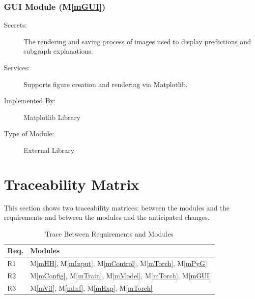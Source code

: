 \documentclass[12pt, titlepage]{article}
\newcommand{\mref}[1]{M\ref{#1}}
\begin{document}
\subsubsection{GUI Module (\mref{mGUI})}
\begin{description} 
\item[Secrets:] The rendering and saving process of images used to display predictions and subgraph explanations. \item[Services:] Supports figure creation and rendering via Matplotlib.
\item[Implemented By:] Matplotlib Library 
\item[Type of Module:] External Library \end{description}




\section{Traceability Matrix} \label{SecTM}

This section shows two traceability matrices: between the modules and the
requirements and between the modules and the anticipated changes.

\begin{table}[H]
\centering
\begin{tabular}{p{} p{}}
\toprule
\textbf{Req.} & \textbf{Modules}\\
\midrule
R1 & \mref{mHH}, \mref{mInput}, \mref{mControl}, \mref{mTorch}, \mref{mPyG}\\
R2 & \mref{mConfig}, \mref{mTrain}, \mref{mModel}, \mref{mTorch}, \mref{mGUI}\\
R3 & \mref{mVil}, \mref{mInf}, \mref{mExp}, \mref{mTorch} \\
\bottomrule
\end{tabular}
\caption{Trace Between Requirements and Modules}
\label{TblRT}
\end{table}
\end{document}
